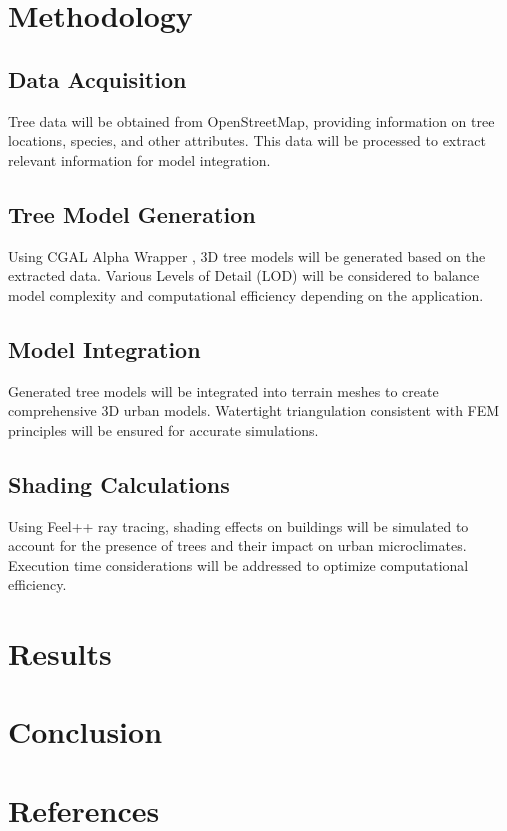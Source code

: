 \documentclass[12pt]{article}
\begin{document}
\newpage

\section{Methodology}

\subsection{Data Acquisition}
Tree data will be obtained from OpenStreetMap, providing information on tree locations, 
species, and other attributes. This data will be processed to extract relevant 
information for model integration.

\subsection{Tree Model Generation}
Using CGAL Alpha Wrapper \cite{cgal_alpha_wrapper}, 3D tree models will be generated based on the extracted data. Various 
Levels of Detail (LOD) will be considered to balance model complexity and computational 
efficiency depending on the application.

\subsection{Model Integration}
Generated tree models will be integrated into terrain meshes to create comprehensive 
3D urban models. Watertight triangulation consistent with FEM principles will be ensured 
for accurate simulations.

\subsection{Shading Calculations}
Using Feel++ ray tracing, shading effects on buildings will be simulated to account for the presence 
of trees and their impact on urban microclimates. Execution time considerations will be 
addressed to optimize computational efficiency.

\newpage

\section{Results}


\newpage

\section{Conclusion}


\newpage

\section{References}


\end{document}

